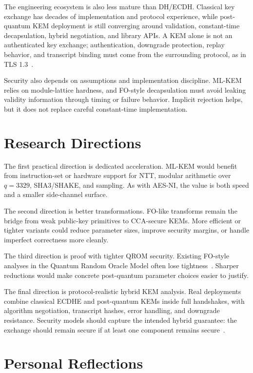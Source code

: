 The engineering ecosystem is also less mature than DH/ECDH. Classical key
exchange has decades of implementation and protocol experience, while
post-quantum KEM deployment is still converging around validation, constant-time
decapsulation, hybrid negotiation, and library APIs. A KEM alone is not an
authenticated key exchange; authentication, downgrade protection, replay
behavior, and transcript binding must come from the surrounding protocol, as in
TLS 1.3~\cite{rfc8446,dowling2021cryptographic}.

Security also depends on assumptions and implementation discipline. ML-KEM
relies on module-lattice hardness, and FO-style decapsulation must avoid
leaking validity information through timing or failure behavior. Implicit
rejection helps, but it does not replace careful constant-time implementation.

\section{Research Directions}

The first practical direction is dedicated acceleration. ML-KEM would benefit
from instruction-set or hardware support for NTT, modular arithmetic over
$q=3329$, SHA3/SHAKE, and sampling. As with AES-NI, the value is both speed and
a smaller side-channel surface.

The second direction is better transformations. FO-like transforms remain the
bridge from weak public-key primitives to CCA-secure KEMs. More efficient or
tighter variants could reduce parameter sizes, improve security margins, or
handle imperfect correctness more cleanly.

The third direction is proof with tighter QROM security. Existing FO-style analyses in the
Quantum Random Oracle Model often lose tightness~\cite{targhi2016post,hofheinz2017modular}.
Sharper reductions would make concrete post-quantum parameter choices easier to
justify.

The final direction is protocol-realistic hybrid KEM analysis. Real deployments
combine classical ECDHE and post-quantum KEMs inside full handshakes, with
algorithm negotiation, transcript hashes, error handling, and downgrade
resistance. Security models should capture the intended hybrid guarantee: the
exchange should remain secure if at least one component remains secure~\cite{dowling2020many}.

\section{Personal Reflections}

